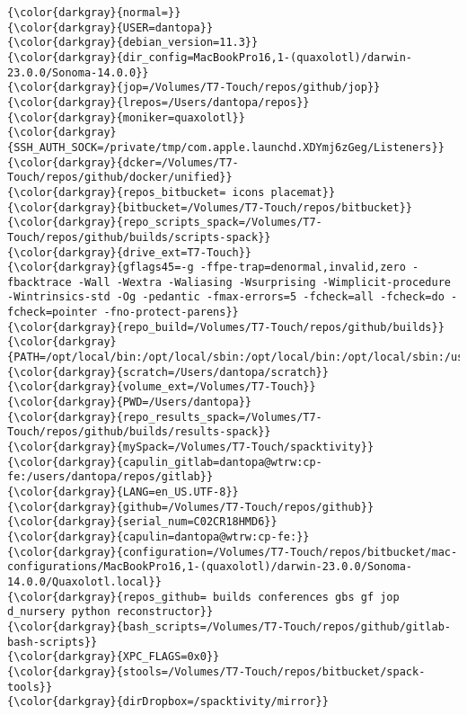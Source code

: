 {{\begin{Verbatim}[commandchars=\\\{\}]
{\color{darkgray}{normal=}}
{\color{darkgray}{USER=dantopa}}
{\color{darkgray}{debian_version=11.3}}
{\color{darkgray}{dir_config=MacBookPro16,1-(quaxolotl)/darwin-23.0.0/Sonoma-14.0.0}}
{\color{darkgray}{jop=/Volumes/T7-Touch/repos/github/jop}}
{\color{darkgray}{lrepos=/Users/dantopa/repos}}
{\color{darkgray}{moniker=quaxolotl}}
{\color{darkgray}{SSH_AUTH_SOCK=/private/tmp/com.apple.launchd.XDYmj6zGeg/Listeners}}
{\color{darkgray}{dcker=/Volumes/T7-Touch/repos/github/docker/unified}}
{\color{darkgray}{repos_bitbucket= icons placemat}}
{\color{darkgray}{bitbucket=/Volumes/T7-Touch/repos/bitbucket}}
{\color{darkgray}{repo_scripts_spack=/Volumes/T7-Touch/repos/github/builds/scripts-spack}}
{\color{darkgray}{drive_ext=T7-Touch}}
{\color{darkgray}{gflags45=-g -ffpe-trap=denormal,invalid,zero -fbacktrace -Wall -Wextra -Waliasing -Wsurprising -Wimplicit-procedure -Wintrinsics-std -Og -pedantic -fmax-errors=5 -fcheck=all -fcheck=do -fcheck=pointer -fno-protect-parens}}
{\color{darkgray}{repo_build=/Volumes/T7-Touch/repos/github/builds}}
{\color{darkgray}{PATH=/opt/local/bin:/opt/local/sbin:/opt/local/bin:/opt/local/sbin:/usr/local/bin:/System/Cryptexes/App/usr/bin:/usr/bin:/bin:/usr/sbin:/sbin:/var/run/com.apple.security.cryptexd/codex.system/bootstrap/usr/local/bin:/var/run/com.apple.security.cryptexd/codex.system/bootstrap/usr/bin:/var/run/com.apple.security.cryptexd/codex.system/bootstrap/usr/appleinternal/bin:/opt/X11/bin:/Library/Apple/usr/bin:/Library/TeX/texbin:/opt/podman/bin:/Users/dantopa/.cabal/bin:/Users/dantopa/.ghcup/bin}}
{\color{darkgray}{scratch=/Users/dantopa/scratch}}
{\color{darkgray}{volume_ext=/Volumes/T7-Touch}}
{\color{darkgray}{PWD=/Users/dantopa}}
{\color{darkgray}{repo_results_spack=/Volumes/T7-Touch/repos/github/builds/results-spack}}
{\color{darkgray}{mySpack=/Volumes/T7-Touch/spacktivity}}
{\color{darkgray}{capulin_gitlab=dantopa@wtrw:cp-fe:/users/dantopa/repos/gitlab}}
{\color{darkgray}{LANG=en_US.UTF-8}}
{\color{darkgray}{github=/Volumes/T7-Touch/repos/github}}
{\color{darkgray}{serial_num=C02CR18HMD6}}
{\color{darkgray}{capulin=dantopa@wtrw:cp-fe:}}
{\color{darkgray}{configuration=/Volumes/T7-Touch/repos/bitbucket/mac-configurations/MacBookPro16,1-(quaxolotl)/darwin-23.0.0/Sonoma-14.0.0/Quaxolotl.local}}
{\color{darkgray}{repos_github= builds conferences gbs gf jop d_nursery python reconstructor}}
{\color{darkgray}{bash_scripts=/Volumes/T7-Touch/repos/github/gitlab-bash-scripts}}
{\color{darkgray}{XPC_FLAGS=0x0}}
{\color{darkgray}{stools=/Volumes/T7-Touch/repos/bitbucket/spack-tools}}
{\color{darkgray}{dirDropbox=/spacktivity/mirror}}

\end{Verbatim}}}
